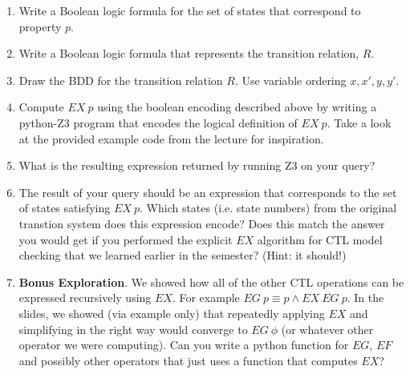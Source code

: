 \documentclass[12pt]{article}
\newenvironment{problem}[2][Problem]{\begin{trivlist}
\item[\hskip \labelsep {\bfseries #1}\hskip \labelsep {\bfseries #2.}]}{\end{trivlist}}
\begin{document}
\begin{problem}{Symbolic Model Checking}
\begin{enumerate}[label=\roman*.]
\item  Write a Boolean logic formula for the set of states that correspond to property $p$.

\item  Write a Boolean logic formula that represents the transition relation, $R$.

\item Draw the BDD for the transition relation $R$. Use variable ordering $x, x', y, y'$.

\item Compute $EX \ p$ using the boolean encoding described above by writing a python-Z3 program that encodes the logical definition of $EX \ p$. Take a look at the provided example code from the lecture for inspiration.

\item What is the resulting expression returned by running Z3 on your query?

\item The result of your query should be an expression that corresponds to the set of states satisfying $EX \ p$. Which states (i.e. state numbers) from the original transtion system does this expression encode? Does this match the answer you would get if you performed the explicit $EX$ algorithm for CTL model checking that we learned earlier in the semester? (Hint: it should!)


\item \textbf{Bonus Exploration}. We showed how all of the other CTL operations can be expressed recursively using $EX$. For example $EG \ p \equiv p \land EX \ EG \ p$. In the slides, we showed (via example only) that repeatedly applying $EX$ and simplifying in the right way would converge to $EG \ \phi$ (or whatever other operator we were computing). Can you write a python function for $EG$, $EF$ and possibly other operators that just uses a function that computes $EX$?  


\end{enumerate}

\end{problem}
\end{document}
